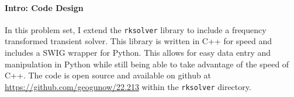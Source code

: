 \documentclass[12pt]{report}
\begin{document}
	
	
	\maketitle
	
	\paragraph{Intro: Code Design}
	In this problem set, I extend the \texttt{rksolver} library to include a frequency transformed transient solver. This library is written in C++ for speed and includes a SWIG wrapper for Python. This allows for easy data entry and manipulation in Python while still being able to take advantage of the speed of C++. The code is open source and available on github at \url{https://github.com/geogunow/22.213} within the \texttt{rksolver} directory.
	
\end{document}
